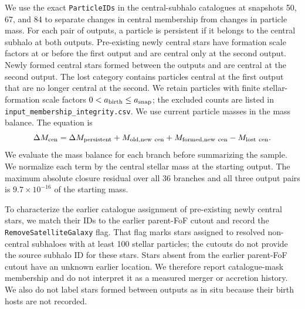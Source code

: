 \documentclass[usenatbib]{mnras}
\begin{document}
We use the exact \texttt{ParticleIDs} in the central-subhalo catalogues at
snapshots 50, 67, and 84 to separate changes in central membership from
changes in particle mass. For each pair of outputs, a particle is persistent
if it belongs to the central subhalo at both outputs. Pre-existing newly
central stars have formation scale factors at or before the first output and
are central only at the second output. Newly formed central stars formed
between the outputs and are central at the second output. The lost category
contains particles central at the first output that are no longer central at
the second. We retain particles with finite stellar-formation scale factors
$0<a_{\rm birth}\leq a_{\rm snap}$; the excluded counts are listed in
\texttt{input\_membership\_integrity.csv}. We use current particle masses in
the mass balance. The equation is
\begin{equation}
\Delta M_{\rm cen}=\Delta M_{\rm persistent}
+M_{\rm old,new\ cen}
+M_{\rm formed,new\ cen}
-M_{\rm lost\ cen}.
\end{equation}
We evaluate the mass balance for each branch before summarizing the sample. We
normalize each term by the central stellar mass at the starting output.
The maximum absolute closure residual over all 36 branches and all three
output pairs is $9.7\times10^{-16}$ of the starting mass.

To characterize the earlier catalogue assignment of pre-existing newly
central stars, we match their IDs to the earlier parent-FoF cutout and record
the \texttt{RemoveSatelliteGalaxy} flag. That flag marks stars assigned to
resolved non-central subhaloes with at least 100 stellar particles; the
cutouts do not provide the source subhalo ID for these stars. Stars absent
from the earlier parent-FoF cutout have an unknown earlier location. We
therefore report catalogue-mask membership and do not interpret it as a
measured merger or accretion history. We also do not label stars formed
between outputs as in situ because their birth hosts are not recorded.
\end{document}
